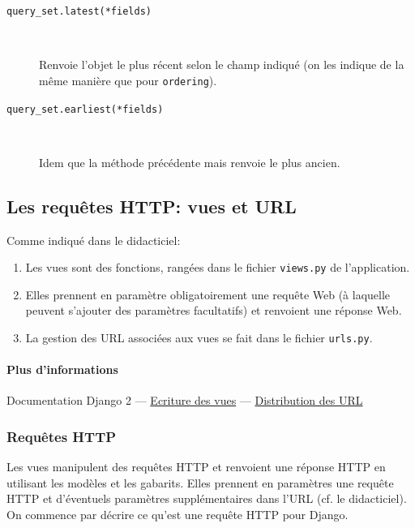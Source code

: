\documentclass[a4paper, 10pt]{article}
\begin{document}
{\begin{itemize}
\begin{description}
        \item[\texttt{query_set.latest(*fields)}]~

        Renvoie l'objet le plus récent selon le champ indiqué (on les indique de la même manière que pour \texttt{ordering}).

        \item[\texttt{query_set.earliest(*fields)}]~

        Idem que la méthode précédente mais renvoie le plus ancien.

    \end{description}
\end{itemize}

\subsection{Les requêtes HTTP: vues et URL}
Comme indiqué dans le didacticiel:
\begin{enumerate}
    \item Les vues sont des fonctions, rangées dans le fichier \texttt{views.py} de l'application.
    \item Elles prennent en paramètre obligatoirement une requête Web (à laquelle peuvent s'ajouter des paramètres facultatifs) et renvoient une réponse Web.
    \item La gestion des URL associées aux vues se fait dans le fichier \texttt{urls.py}.
\end{enumerate}

\paragraph{Plus d'informations} Documentation Django 2 --- \href{https://docs.djangoproject.com/fr/2.0/topics/http/views/}{Ecriture des vues} ---  \href{https://docs.djangoproject.com/fr/2.0/topics/http/urls/}{Distribution des URL}

\subsubsection{Requêtes HTTP}
Les  vues manipulent des requêtes HTTP et renvoient une réponse HTTP en utilisant les modèles et les gabarits. Elles prennent en paramètres une requête HTTP et d'éventuels paramètres supplémentaires dans l'URL (cf. le didacticiel). On commence par décrire ce qu'est une requête HTTP pour Django.

}
\end{document}
